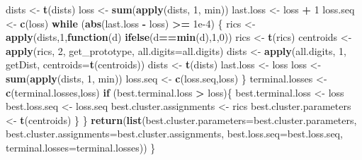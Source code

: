 \documentclass[]{article}
\newenvironment{Shaded}{\begin{snugshade}}{\end{snugshade}}
\newcommand{\KeywordTok}[1]{\textcolor[rgb]{0.13,0.29,0.53}{\textbf{#1}}}
\newcommand{\DataTypeTok}[1]{\textcolor[rgb]{0.13,0.29,0.53}{#1}}
\newcommand{\DecValTok}[1]{\textcolor[rgb]{0.00,0.00,0.81}{#1}}
\newcommand{\FloatTok}[1]{\textcolor[rgb]{0.00,0.00,0.81}{#1}}
\newcommand{\StringTok}[1]{\textcolor[rgb]{0.31,0.60,0.02}{#1}}
\newcommand{\ControlFlowTok}[1]{\textcolor[rgb]{0.13,0.29,0.53}{\textbf{#1}}}
\newcommand{\OperatorTok}[1]{\textcolor[rgb]{0.81,0.36,0.00}{\textbf{#1}}}
\newcommand{\NormalTok}[1]{#1}
\begin{document}
\begin{Shaded}
\begin{Highlighting}[]
\NormalTok{    dists <-}\StringTok{ }\KeywordTok{t}\NormalTok{(dists)}
\NormalTok{    loss <-}\StringTok{ }\KeywordTok{sum}\NormalTok{(}\KeywordTok{apply}\NormalTok{(dists, }\DecValTok{1}\NormalTok{, min))}
\NormalTok{    last.loss <-}\StringTok{ }\NormalTok{loss }\OperatorTok{+}\StringTok{ }\DecValTok{1}
\NormalTok{    loss.seq <-}\StringTok{ }\KeywordTok{c}\NormalTok{(loss)}
    \ControlFlowTok{while}\NormalTok{ (}\KeywordTok{abs}\NormalTok{(last.loss }\OperatorTok{-}\StringTok{ }\NormalTok{loss) }\OperatorTok{>=}\StringTok{ }\FloatTok{1e-4}\NormalTok{) \{}
\NormalTok{      rics <-}\StringTok{ }\KeywordTok{apply}\NormalTok{(dists,}\DecValTok{1}\NormalTok{,}\ControlFlowTok{function}\NormalTok{(d) }\KeywordTok{ifelse}\NormalTok{(d}\OperatorTok{==}\KeywordTok{min}\NormalTok{(d),}\DecValTok{1}\NormalTok{,}\DecValTok{0}\NormalTok{))}
\NormalTok{      rics <-}\StringTok{ }\KeywordTok{t}\NormalTok{(rics)}
\NormalTok{      centroids <-}\StringTok{ }\KeywordTok{apply}\NormalTok{(rics, }\DecValTok{2}\NormalTok{, get_prototype, }\DataTypeTok{all.digits=}\NormalTok{all.digits)}
\NormalTok{      dists <-}\StringTok{ }\KeywordTok{apply}\NormalTok{(all.digits, }\DecValTok{1}\NormalTok{, getDist, }\DataTypeTok{centroids=}\KeywordTok{t}\NormalTok{(centroids))}
\NormalTok{      dists <-}\StringTok{ }\KeywordTok{t}\NormalTok{(dists)}
\NormalTok{      last.loss <-}\StringTok{ }\NormalTok{loss}
\NormalTok{      loss <-}\StringTok{ }\KeywordTok{sum}\NormalTok{(}\KeywordTok{apply}\NormalTok{(dists, }\DecValTok{1}\NormalTok{, min))}
\NormalTok{      loss.seq <-}\StringTok{ }\KeywordTok{c}\NormalTok{(loss.seq,loss)}
\NormalTok{    \}}
\NormalTok{    terminal.losses <-}\StringTok{ }\KeywordTok{c}\NormalTok{(terminal.losses,loss)}
    \ControlFlowTok{if}\NormalTok{ (best.terminal.loss }\OperatorTok{>}\StringTok{ }\NormalTok{loss)\{}
\NormalTok{      best.terminal.loss <-}\StringTok{ }\NormalTok{loss}
\NormalTok{      best.loss.seq <-}\StringTok{ }\NormalTok{loss.seq}
\NormalTok{      best.cluster.assignments <-}\StringTok{ }\NormalTok{rics}
\NormalTok{      best.cluster.parameters <-}\StringTok{ }\KeywordTok{t}\NormalTok{(centroids)}
\NormalTok{    \}}
\NormalTok{  \}}
  \KeywordTok{return}\NormalTok{(}\KeywordTok{list}\NormalTok{(}\DataTypeTok{best.cluster.parameters=}\NormalTok{best.cluster.parameters, }\DataTypeTok{best.cluster.assignments=}\NormalTok{best.cluster.assignments, }\DataTypeTok{best.loss.seq=}\NormalTok{best.loss.seq, }\DataTypeTok{terminal.losses=}\NormalTok{terminal.losses))}
\NormalTok{\}}
\end{Highlighting}
\end{Shaded}
\end{document}
